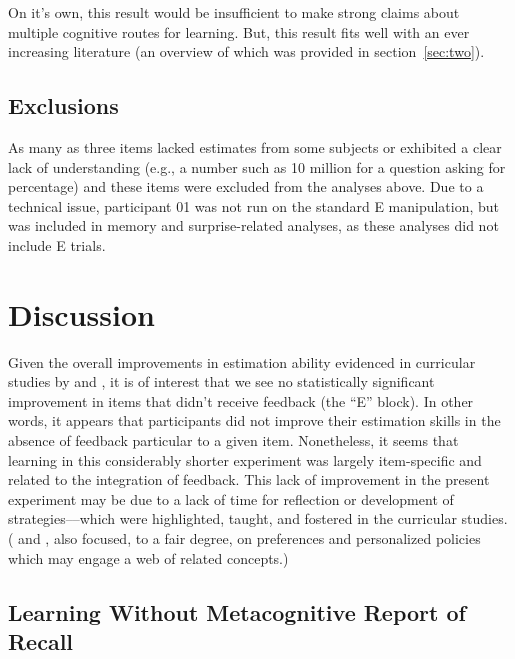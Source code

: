 On it's own, this result would be insufficient to make strong claims about
multiple cognitive routes for learning. But, this result fits well with an ever
increasing literature (an overview of which was provided in
section~\ref{sec:two}).

\subsection{Exclusions}

As many as three items lacked estimates from some subjects or exhibited a clear
lack of understanding (e.g., a number such as 10 million for a question asking
for percentage) and these items were excluded from the analyses above. Due to a
technical issue, participant 01 was not run on the standard E manipulation, but
was included in memory and surprise-related analyses, as these analyses did not
include E trials.

\section{Discussion}

Given the overall improvements in estimation ability evidenced in curricular
studies by \textcite{munnich_numerically-driven_2004} and
\textcite{ranney_designing_2008}, it is of interest that we see no statistically
significant improvement in items that didn't receive feedback (the ``E'' block).
In other words, it appears that participants did not improve their estimation
skills in the absence of feedback particular to a given item.
Nonetheless, it seems that learning in this considerably shorter experiment was
largely item-specific and related to the integration of feedback. This lack of
improvement in the present experiment may be due to a lack of time for
reflection or development of strategies––which were highlighted, taught, and
fostered in the curricular studies.
( and , also focused, to
a fair degree, on preferences and personalized policies which may engage a web
of related concepts.)

\subsection{Learning Without Metacognitive Report of Recall}

